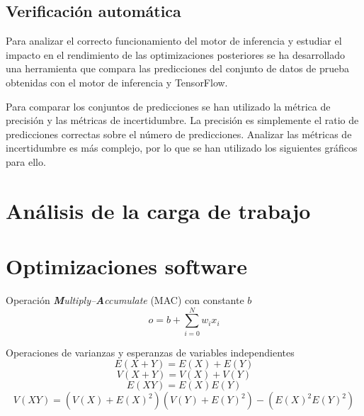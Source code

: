 \subsection{Verificación automática}

Para analizar el correcto funcionamiento del motor de inferencia y estudiar el impacto en el rendimiento de las optimizaciones posteriores se ha desarrollado una herramienta que compara las predicciones del conjunto de datos de prueba obtenidas con el motor de inferencia y TensorFlow.

Para comparar los conjuntos de predicciones se han utilizado la métrica de precisión y las métricas de incertidumbre. La precisión es simplemente el ratio de predicciones correctas sobre el número de predicciones. Analizar las métricas de incertidumbre es más complejo, por lo que se han utilizado los siguientes gráficos para ello.\\


\section{Análisis de la carga de trabajo}

\section{Optimizaciones software}
\todo

Operación \textit{\textbf{M}ultiply–\textbf{A}ccumulate} (MAC) con constante $b$
\begin{equation} \label{eq:mac}
o = b + \sum_{i=0}^N w_i x_i
\end{equation}

Operaciones de varianzas y esperanzas de variables independientes \todo
\begin{equation} \label{eq:neuron_variance}
E(X+Y) = E(X)+ E(Y)
\end{equation}
\begin{equation} \label{eq:neuron_variance}
V(X+Y) = V(X) + V(Y)
\end{equation}
\begin{equation} \label{eq:neuron_variance}
E(XY) = E(X)E(Y)
\end{equation}
\begin{equation} \label{eq:neuron_variance}
V(XY) = (V(X)+E(X)^2)(V(Y)+E(Y)^2) - (E(X)^2E(Y)^2)
\end{equation}

